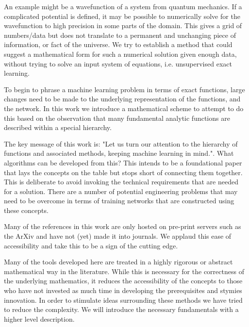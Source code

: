 \documentclass[journal=jcisd8,manuscript=article,layout=onecolumn,pdftex,floatfix,amsmath,amssymb,10pt]{achemso}
\begin{document}
An example might be a wavefunction of a system from quantum mechanics. If a complicated potential is defined, it may be possible to numerically solve for the wavefunction to high precision in some parts of the domain. This gives a grid of numbers/data but does not translate to a permanent and unchanging piece of information, or fact of the universe. We try to establish a method that could suggest a mathematical form for such a numerical solution given enough data, without trying to solve an input system of equations, i.e. unsupervised exact learning.

To begin to phrase a machine learning problem in terms of exact functions, large changes need to be made to the underlying representation of the functions, and the network. In this work we introduce a mathematical scheme to attempt to do this based on the observation that many fundamental analytic functions are described within a special hierarchy.

The key message of this work is: "Let us turn our attention to the hierarchy of functions and associated methods, keeping machine learning in mind.". What algorithms can be developed from this? This intends to be a foundational paper that lays the concepts on the table but stops short of connecting them together. This is deliberate to avoid invoking the technical requirements that are needed for a solution. There are a number of potential engineering problems that may need to be overcome in terms of training networks that are constructed using these concepts.

Many of the references in this work are only hosted on pre-print servers such as the ArXiv and have not (yet) made it into journals. We applaud this ease of accessibility and take this to be a sign of the cutting edge.


Many of the tools developed here are treated in a highly rigorous or abstract mathematical way in the literature. While this is necessary for the correctness of the underlying mathematics, it reduces the accessibility of the concepts to those who have not invested as much time in developing the prerequisites and stymies innovation. In order to stimulate ideas surrounding these methods we have tried to reduce the complexity. We will introduce the necessary fundamentals with a higher level description. 
\end{document}
